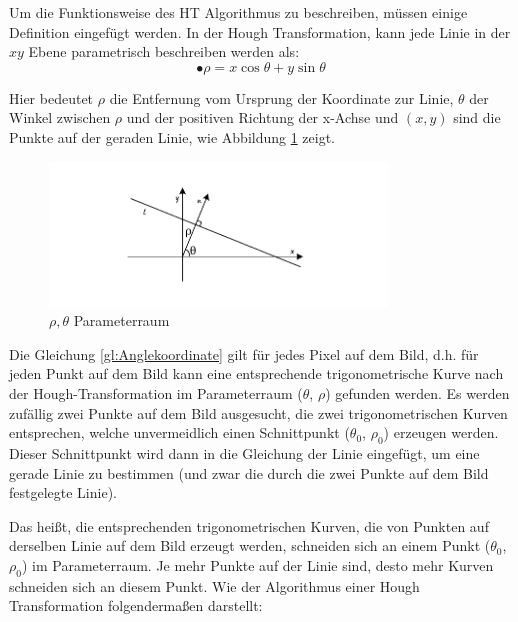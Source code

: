Um die Funktionsweise des HT Algorithmus zu beschreiben, müssen einige Definition eingefügt werden. In der Hough Transformation, kann jede Linie in der $ xy $ Ebene parametrisch beschreiben werden als:
\begin{equation}
•  \rho = x \cos \theta + y \sin \theta
 \label{gl:Anglekoordinate}
\end{equation} 

Hier bedeutet $ \rho $ die Entfernung vom Ursprung der Koordinate zur Linie, $ \theta $ der Winkel zwischen $ \rho $ und der positiven Richtung der x-Achse und $ (x,y) $ sind die Punkte auf der geraden Linie, wie Abbildung \ref{fig:Hough} zeigt.

\begin{figure}[H]
 \centering 
  \includegraphics[keepaspectratio,width=0.8\textwidth]{images/4_ZweiteErfahrung/Hough/Hough.pdf}
 \caption{$ \rho,\theta $ Parameterraum}
 \label{fig:Hough}
\end{figure}

Die Gleichung \ref{gl:Anglekoordinate} gilt für jedes Pixel auf dem Bild, d.h. für jeden Punkt auf dem Bild kann eine entsprechende trigonometrische Kurve nach der Hough-Transformation im Parameterraum ($ \theta $, $ \rho $) gefunden werden. Es werden zufällig zwei Punkte auf dem Bild ausgesucht, die zwei trigonometrischen Kurven entsprechen, welche unvermeidlich einen Schnittpunkt ($ \theta_0 $, $ \rho_0 $) erzeugen werden. Dieser Schnittpunkt wird dann in die Gleichung der Linie eingefügt, um eine gerade Linie zu bestimmen (und zwar die durch die zwei Punkte auf dem Bild festgelegte Linie). 

Das heißt, die entsprechenden trigonometrischen Kurven, die von Punkten auf derselben Linie auf dem Bild erzeugt werden, schneiden sich an einem Punkt ($ \theta_0 $, $ \rho_0 $) im Parameterraum. Je mehr Punkte auf der Linie sind, desto mehr Kurven schneiden sich an diesem Punkt. Wie der Algorithmus einer Hough Transformation folgendermaßen darstellt:

